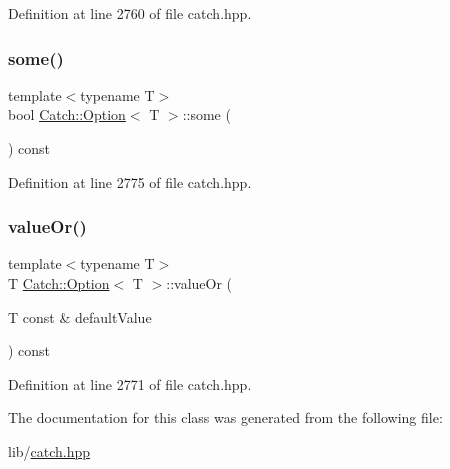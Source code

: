 Definition at line 2760 of file catch.\+hpp.

\hypertarget{class_catch_1_1_option_a97c95829afbe92f2bcc5fd75b32c0825}{}\label{class_catch_1_1_option_a97c95829afbe92f2bcc5fd75b32c0825} 
\subsubsection{\texorpdfstring{some()}{some()}}
{\footnotesize\ttfamily template$<$typename T$>$ \\
bool \hyperlink{class_catch_1_1_option}{Catch\+::\+Option}$<$ T $>$\+::some (\begin{DoxyParamCaption}{ }\end{DoxyParamCaption}) const\hspace{0.3cm}{\ttfamily [inline]}}



Definition at line 2775 of file catch.\+hpp.

\hypertarget{class_catch_1_1_option_a8d9ae2e30b0eb76fe134a6fbc8423124}{}\label{class_catch_1_1_option_a8d9ae2e30b0eb76fe134a6fbc8423124} 
\subsubsection{\texorpdfstring{value\+Or()}{valueOr()}}
{\footnotesize\ttfamily template$<$typename T$>$ \\
T \hyperlink{class_catch_1_1_option}{Catch\+::\+Option}$<$ T $>$\+::value\+Or (\begin{DoxyParamCaption}\item[{T const \&}]{default\+Value }\end{DoxyParamCaption}) const\hspace{0.3cm}{\ttfamily [inline]}}



Definition at line 2771 of file catch.\+hpp.



The documentation for this class was generated from the following file\+:\begin{DoxyCompactItemize}
\item 
lib/\hyperlink{catch_8hpp}{catch.\+hpp}\end{DoxyCompactItemize}
